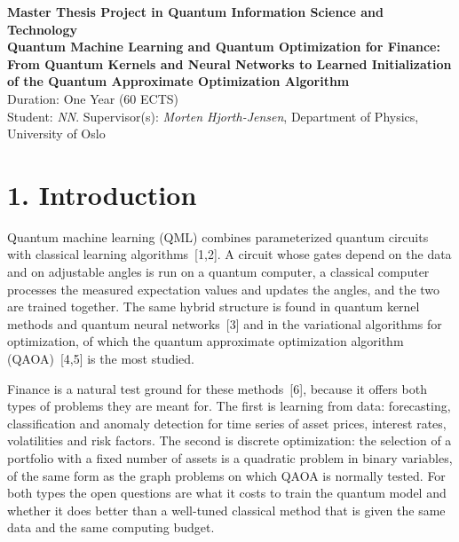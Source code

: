 \documentclass[12pt,a4paper]{article}
\begin{document}
\begin{center}
    {\Large \textbf{Master Thesis Project in Quantum Information Science and Technology}}\\[0.3cm]
    {\large \textbf{Quantum Machine Learning and Quantum Optimization for Finance: From Quantum Kernels and Neural Networks to Learned Initialization of the Quantum Approximate Optimization Algorithm}}\\[0.2cm]
    \vspace{0.3cm}
    {Duration: One Year (60 ECTS)}\\[0.2cm]
    {Student: \textit{NN}. Supervisor(s): \textit{Morten Hjorth-Jensen}, Department of Physics, University of Oslo}
\end{center}

\vspace{1cm}

\section*{1. Introduction}

Quantum machine learning (QML) combines parameterized quantum circuits
with classical learning algorithms~[1,2].  A circuit whose gates
depend on the data and on adjustable angles is run on a quantum
computer, a classical computer processes the measured expectation
values and updates the angles, and the two are trained together.  The
same hybrid structure is found in quantum kernel methods and quantum
neural networks~[3] and in the variational algorithms for
optimization, of which the quantum approximate optimization algorithm
(QAOA)~[4,5] is the most studied.

Finance is a natural test ground for these methods~[6], because it
offers both types of problems they are meant for.  The first is
learning from data: forecasting, classification and anomaly detection
for time series of asset prices, interest rates, volatilities and risk
factors.  The second is discrete optimization: the selection of a
portfolio with a fixed number of assets is a quadratic problem in
binary variables, of the same form as the graph problems on which QAOA
is normally tested.  For both types the open questions are what it
costs to train the quantum model and whether it does better than a
well-tuned classical method that is given the same data and the same
computing budget.
\end{document}
